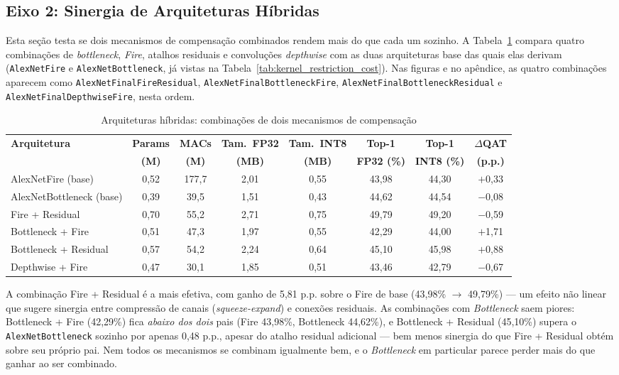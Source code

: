 \documentclass[conference]{IEEEtran}
\begin{document}
\subsection{Eixo 2: Sinergia de Arquiteturas Híbridas}

Esta seção testa se dois mecanismos de compensação combinados rendem mais do que cada um sozinho.
A Tabela~\ref{tab:phase4_ablation} compara quatro combinações de \textit{bottleneck},
\textit{Fire}, atalhos residuais e convoluções \textit{depthwise} com as duas arquiteturas base das
quais elas derivam (\texttt{AlexNetFire} e \texttt{AlexNetBottleneck}, já vistas na
Tabela~\ref{tab:kernel_restriction_cost}). Nas figuras e no apêndice, as quatro combinações
aparecem como \texttt{AlexNetFinalFireResidual}, \texttt{AlexNetFinalBottleneckFire},
\texttt{AlexNetFinalBottleneckResidual} e \texttt{AlexNetFinalDepthwiseFire}, nesta ordem.

\begin{table}[!t]
\caption{Arquiteturas híbridas: combinações de dois mecanismos de compensação}
\label{tab:phase4_ablation}
\centering
\small
\begin{tabular}{@{}lccccccc@{}}
\toprule
\textbf{Arquitetura} & \textbf{Params} & \textbf{MACs} & \textbf{Tam.\ FP32} & \textbf{Tam.\ INT8} & \textbf{Top-1} & \textbf{Top-1} & \textbf{$\Delta$QAT} \\
 & \textbf{(M)} & \textbf{(M)} & \textbf{(MB)} & \textbf{(MB)} & \textbf{FP32 (\%)} & \textbf{INT8 (\%)} & \textbf{(p.p.)} \\
\midrule
AlexNetFire (base) & 0,52 & 177,7 & 2,01 & 0,55 & 43,98 & 44,30 & $+$0,33 \\
AlexNetBottleneck (base) & 0,39 & 39,5 & 1,51 & 0,43 & 44,62 & 44,54 & $-$0,08 \\
\midrule
Fire + Residual & 0,70 & 55,2 & 2,71 & 0,75 & 49,79 & 49,20 & $-$0,59 \\
Bottleneck + Fire & 0,51 & 47,3 & 1,97 & 0,55 & 42,29 & 44,00 & $+$1,71 \\
Bottleneck + Residual & 0,57 & 54,2 & 2,24 & 0,64 & 45,10 & 45,98 & $+$0,88 \\
Depthwise + Fire & 0,47 & 30,1 & 1,85 & 0,51 & 43,46 & 42,79 & $-$0,67 \\
\bottomrule
\end{tabular}
\end{table}

A combinação Fire + Residual é a mais efetiva, com ganho de 5,81 p.p. sobre o Fire de base
(43,98\% $\to$ 49,79\%) — um efeito não linear que sugere sinergia entre compressão de canais
(\textit{squeeze-expand}) e conexões residuais. As combinações com \textit{Bottleneck} saem piores:
Bottleneck + Fire (42,29\%) fica \emph{abaixo dos dois} pais (Fire 43,98\%, Bottleneck 44,62\%), e
Bottleneck + Residual (45,10\%) supera o \texttt{AlexNetBottleneck} sozinho por apenas 0,48 p.p.,
apesar do atalho residual adicional — bem menos sinergia do que Fire + Residual obtém sobre seu
próprio pai. Nem todos os mecanismos se combinam igualmente bem, e o \textit{Bottleneck} em
particular parece perder mais do que ganhar ao ser combinado.
\end{document}
